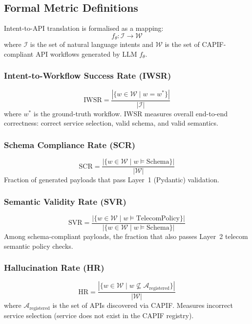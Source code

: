 \documentclass[conference]{IEEEtran}
\begin{document}
\subsection{Formal Metric Definitions}

Intent-to-API translation is formalised as a mapping:
\[ f_\theta : \mathcal{I} \rightarrow \mathcal{W} \]
where $\mathcal{I}$ is the set of natural language intents and $\mathcal{W}$
is the set of CAPIF-compliant API workflows generated by LLM $f_\theta$.

\subsubsection{Intent-to-Workflow Success Rate (IWSR)}
\begin{equation}
  \text{IWSR} = \frac{|\{w \in \mathcal{W} \mid w = w^*\}|}{|\mathcal{I}|}
\end{equation}
where $w^*$ is the ground-truth workflow. IWSR measures overall end-to-end
correctness: correct service selection, valid schema, and valid semantics.

\subsubsection{Schema Compliance Rate (SCR)}
\begin{equation}
  \text{SCR} = \frac{|\{w \in \mathcal{W} \mid w \models \text{Schema}\}|}{|\mathcal{W}|}
\end{equation}
Fraction of generated payloads that pass Layer~1 (Pydantic) validation.

\subsubsection{Semantic Validity Rate (SVR)}
\begin{equation}
  \text{SVR} = \frac{|\{w \in \mathcal{W} \mid w \models \text{TelecomPolicy}\}|}
               {|\{w \in \mathcal{W} \mid w \models \text{Schema}\}|}
\end{equation}
Among schema-compliant payloads, the fraction that also passes Layer~2
telecom semantic policy checks.

\subsubsection{Hallucination Rate (HR)}
\begin{equation}
  \text{HR} = \frac{|\{w \in \mathcal{W} \mid w \not\subseteq \mathcal{A}_\text{registered}\}|}
               {|\mathcal{W}|}
\end{equation}
where $\mathcal{A}_\text{registered}$ is the set of APIs discovered via
CAPIF. Measures incorrect service selection (service does not exist in
the CAPIF registry).
\end{document}
